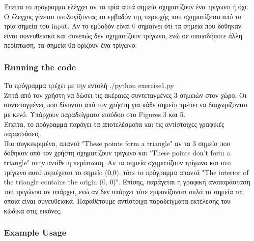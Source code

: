 \documentclass[12pt]{article}
\begin{document}
Έπειτα το πρόγραμμα ελέγχει αν τα τρία αυτά σημεία σχηματίζουν ένα τρίγωνο ή όχι. Ο έλεγχος γίνεται υπολογίζοντας το εμβαδόν της περιοχής που σχηματίζεται από τα τρία σημεία του input. Αν το εμβαδόν είναι 0 σημαίνει ότι τα σημεία που δόθηκαν είναι συνευθειακά και συνεπώς δεν σχηματίζουν τρίγωνο, ενώ σε οποιαδήποτε άλλη περίπτωση, τα σημεία θα ορίζουν ένα τρίγωνο. \\

\subsubsection*{Running the code}

Το πρόγραμμα τρέχει με την εντολή ./python exercise1.py \\

Ζητά από τον χρήστη να δώσει τις ακέραιες συντεταγμένες 3 σημειών στον χώρο. Οι συντεταγμένες που δίνονται από τον χρήστη για κάθε σημείο πρέπει να διαχωρίζονται με κενό. Υπάρχουν παραδείγματα εισόδου στα Figures 3 και 5. \\

Έπειτα, το πρόγραμμα παράγει τα αποτελέσματα και τις αντίστοιχες γραφικές παραστάσεις. \\

Πιο συγκεκριμένα, απαντά "These points form a triangle" αν τα 3 σημεία που δόθηκαν από τον χρήστη σχηματίζουν τρίγωνο και "These points don't form a triangle" στην αντίθετη περίπτωση. Αν τα σημεία σχηματίζουν τρίγωνο και στο τρίγωνο αυτό περιέχεται το σημείο (0,0), τότε το πρόγραμμα απαντά "The interior of the triangle contains the origin (0, 0)". Επίσης, παράγεται η γραφική αναπαράσταση του τριγώνου αν υπάρχει, ενώ αν δεν υπάρχει τότε εμφανίζονται απλά τα σημεία τα οποία είναι συνευθειακά. Παραθέτουμε αντίστοιχα παραδείγματα εκτέλεσης του κώδικα στις εικόνες. \\

\subsubsection*{Example Usage}
\end{document}

